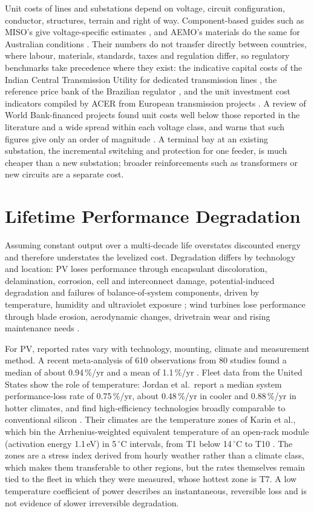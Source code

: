 Unit costs of lines and substations depend on voltage, circuit
configuration, conductor, structures, terrain and right of way.
Component-based guides such as MISO's give voltage-specific estimates
\cite{miso2024}, and AEMO's materials do the same for Australian
conditions \cite{aemo2023}. Their numbers do not transfer directly
between countries, where labour, materials, standards, taxes and
regulation differ, so regulatory benchmarks take precedence where they
exist: the indicative capital costs of the Indian Central Transmission
Utility for dedicated transmission lines \cite{ctuilIndicative2025}, the
reference price bank of the Brazilian regulator \cite{aneelBPR}, and the
unit investment cost indicators compiled by ACER from European
transmission projects \cite{acer2023uic}. A review of World Bank-financed
projects found unit costs well below those reported in the literature and
a wide spread within each voltage class, and warns that such figures give
only an order of magnitude \cite{esmap2026transmission}. A terminal bay
at an existing substation, the incremental switching and protection for
one feeder, is much cheaper than a new substation; broader reinforcements
such as transformers or new circuits are a separate cost.

\section{Lifetime Performance Degradation}
\label{sec:degradation_review}

Assuming constant output over a multi-decade life overstates discounted
energy and therefore understates the levelized cost. Degradation differs
by technology and location: PV loses performance through encapsulant
discoloration, delamination, corrosion, cell and interconnect damage,
potential-induced degradation and failures of balance-of-system
components, driven by temperature, humidity and ultraviolet exposure
\cite{jordan2017}; wind turbines lose performance through blade erosion,
aerodynamic changes, drivetrain wear and rising maintenance needs
\cite{hamilton2020,kim2025}.

For PV, reported rates vary with technology, mounting, climate and
measurement method. A recent meta-analysis of 610 observations from 80
studies found a median of about 0.94\,\%/yr and a mean of 1.1\,\%/yr
\cite{straubmuck2025}. Fleet data from the United States show the role of
temperature: Jordan et al.\ report a median system performance-loss rate
of 0.75\,\%/yr, about 0.48\,\%/yr in cooler and 0.88\,\%/yr in hotter
climates, and find high-efficiency technologies broadly comparable to
conventional silicon \cite{jordan2022}. Their climates are the
temperature zones of Karin et al., which bin the Arrhenius-weighted
equivalent temperature of an open-rack module (activation energy
1.1\,eV) in 5\,$^\circ$C intervals, from T1 below 14\,$^\circ$C to T10
\cite{karin2019}. The zones are a stress index derived from hourly
weather rather than a climate class, which makes them transferable to
other regions, but the rates themselves remain tied to the fleet in which
they were measured, whose hottest zone is T7. A low temperature coefficient of power
describes an instantaneous, reversible loss and is not evidence of slower
irreversible degradation.

